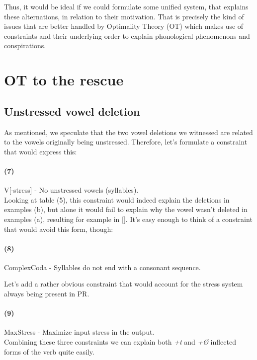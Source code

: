 \documentclass[12pt,draft]{article}
\begin{document}
Thus, it would be ideal if we could formulate some unified system, that explains these alternations, in relation to their motivation.
That is precisely the kind of issues that are better handled by Optimality Theory (OT) which makes use of constraints and their underlying order to explain phonological phenomenons and conspirations. 

\section {OT to the rescue}

\subsection {Unstressed vowel deletion}

As mentioned, we speculate that the two vowel deletions we witnessed are related to the vowels originally being unstressed.
Therefore, let's formulate a constraint that would express this:

\paragraph*{(7)} {{\sc *V[-stress]} - No unstressed vowels (syllables).}
\\

Looking at table (5), this constraint would indeed explain the deletions in examples (b), but alone it would fail to explain why the vowel wasn't deleted in examples (a), resulting for example in [].
It's easy enough to think of a constraint that would avoid this form, though:

\paragraph*{(8)} {{\sc *ComplexCoda} - Syllables do not end with a consonant sequence.}
\\

\pagebreak

Let's add a rather obvious constraint that would account for the stress system always being present in PR.

\paragraph* {(9)} {{\sc MaxStress} - Maximize input stress in the output.}
\\

Combining these three constraints we can explain both \textsl{+t} and \textsl{+\O} inflected forms of the verb quite easily.
\\
\end{document}
